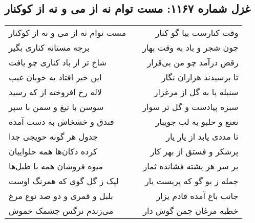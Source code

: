 \begin{center}
\section*{غزل شماره ۱۱۶۷: مست توام نه از می و نه از کوکنار}
\label{sec:1167}
\begin{longtable}{l p{0.5cm} r}
مست توام نه از می و نه از کوکنار
&&
وقت کنارست بیا گو کنار
\\
برجه مستانه کناری بگیر
&&
چون شجر و باد به وقت بهار
\\
شاخ تر از باد کناری چو یافت
&&
رقص درآمد چو من بی‌قرار
\\
این خبر افتاد به خوبان غیب
&&
تا برسیدند هزاران نگار
\\
لاله رخ افروخته از که رسید
&&
سنبله پا به گل از مرغزار
\\
سوسن با تیغ و سمن با سپر
&&
سبزه پیادست و گل تر سوار
\\
فندق و خشخاش به دست آمده
&&
نعنع و حلبو به لب جویبار
\\
جدول هر گونه حویجی جدا
&&
تا مددی یابد از یار یار
\\
کرده دکان‌ها همه حلواییان
&&
پرشکر و فستق از بهر کار
\\
میوه فروشان همه با طبل‌ها
&&
بر سر هر پشته فشانده ثمار
\\
لیک ز گل گوی که همرنگ اوست
&&
جمله ز بو گو که پریست یار
\\
بلبل و قمری و دو صد نوع مرغ
&&
جانب باغ آمده قادم یزار
\\
می‌زندم نرگس چشمک خموش
&&
خطبه مرغان چمن گوش دار
\\
\end{longtable}
\end{center}
